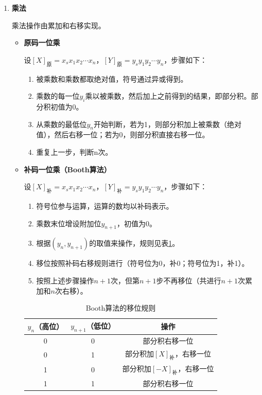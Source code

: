 \documentclass[12pt, a4paper, oneside]{ctexart}
\begin{document}
\begin{enumerate}
  \item {\bf 乘法}
  
  乘法操作由累加和右移实现。

  \begin{itemize}
    \item {\bf 原码一位乘}
    
    设$[X]_\text{原}=x_s x_1 x_2\cdots x_n$，$[Y]_\text{原}=y_s y_1 y_2\cdots y_n$，步骤如下：
    \begin{enumerate}
      \item 被乘数和乘数都取绝对值，符号通过异或得到。
      \item 乘数的每一位$y_i$乘以被乘数，然后加上之前得到的结果，即部分积。部分积初值为0。
      \item 从乘数的最低位$y_n$开始判断，若为1，则部分积加上被乘数（绝对值），然后右移一位；若为0，则部分积直接右移一位。
      \item 重复上一步，判断n次。
    \end{enumerate}

    \item {\bf 补码一位乘（Booth算法）}
    
    设$[X]_\text{补}=x_s x_1 x_2\cdots x_n$，$[Y]_\text{补}=y_s y_1 y_2\cdots y_n$，步骤如下：
    \begin{enumerate}
      \item 符号位参与运算，运算的数均以补码表示。
      \item 乘数末位增设附加位$y_{n+1}$，初值为0。
      \item 根据$(y_n, y_{n+1})$的取值来操作，规则见表\ref{booth-algorithm}。
      \item 移位按照补码右移规则进行（符号位为0，补0；符号位为1，补1）。
      \item 按照上述步骤操作$n+1$次，但第$n+1$步不再移位（共进行$n+1$次累加和$n$次右移）。
    \end{enumerate}

    \begin{table}[h]
      \begin{center}
        \caption{Booth算法的移位规则}
        \label{booth-algorithm}
        \begin{tabular}{|c|c|c|}
          \hline
          $y_n$（高位） & $y_{n+1}$（低位） & 操作 \\ \hline
          0 & 0 & 部分积右移一位 \\ \hline
          0 & 1 & 部分积加$[X]_\text{补}$，右移一位 \\ \hline
          1 & 0 & 部分积加$[-X]_\text{补}$，右移一位 \\ \hline
          1 & 1 & 部分积右移一位 \\
          \hline
        \end{tabular}
      \end{center}
    \end{table}
  \end{itemize}


\end{enumerate}
\end{document}
